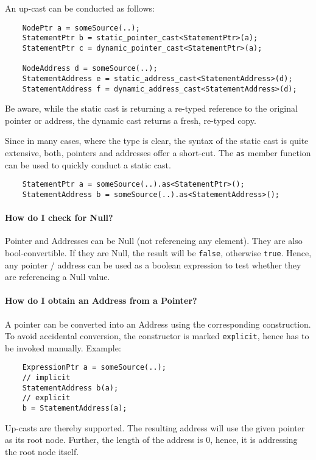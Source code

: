 An up-cast can be conducted as follows:
\begin{lstlisting}
	NodePtr a = someSource(..);
	StatementPtr b = static_pointer_cast<StatementPtr>(a);
	StatementPtr c = dynamic_pointer_cast<StatementPtr>(a);

	NodeAddress d = someSource(..);
	StatementAddress e = static_address_cast<StatementAddress>(d);
	StatementAddress f = dynamic_address_cast<StatementAddress>(d);
\end{lstlisting}

Be aware, while the static cast is returning a re-typed reference to the
original pointer or address, the dynamic cast returns a fresh, re-typed copy.

Since in many cases, where the type is clear, the syntax of the static cast is
quite extensive, both, pointers and addresses offer a short-cut. The \texttt{as}
member function can be used to quickly conduct a static cast.

\begin{lstlisting}
	StatementPtr a = someSource(..).as<StatementPtr>();
	StatementAddress b = someSource(..).as<StatementAddress>();
\end{lstlisting}

\paragraph{How do I check for Null?}
Pointer and Addresses can be Null (not referencing any element). They are also
bool-convertible. If they are Null, the result will be \lstinline|false|,
otherwise \lstinline|true|. Hence, any pointer / address can be used as a
boolean expression to test whether they are referencing a Null value.

\paragraph{How do I obtain an Address from a Pointer?}
A pointer can be converted into an Address using the corresponding construction.
To avoid accidental conversion, the constructor is marked \lstinline|explicit|,
hence has to be invoked manually. Example:
\begin{lstlisting}
	ExpressionPtr a = someSource(..);
	// implicit
	StatementAddress b(a);
	// explicit
	b = StatementAddress(a);
\end{lstlisting}
Up-casts are thereby supported. The resulting address will use the given pointer
as its root node. Further, the length of the address is 0, hence, it is
addressing the root node itself.

